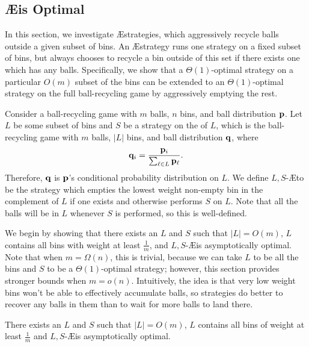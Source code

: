 \subsection{\AE is Optimal}\label{sec:br-randomballaggroempty}

In this section, we investigate \AE strategies, which aggressively recycle
balls outside a given subset of bins.  An \AE strategy runs one strategy on a
fixed subset of bins, but always chooses to recycle a bin outside of this set
if there exists one which has any balls.  Specifically, we show that a
$\Theta(1)$-optimal strategy on a particular $O(m)$ subset of the bins can be
extended to an $\Theta(1)$-optimal strategy on the full ball-recycling game by
aggressively emptying the
rest.

Consider a ball-recycling game with $m$ balls, $n$ bins, and ball distribution
$\mathbf{p}$. Let $L$ be some subset of bins and $S$ be a strategy on the  of $L$, which is the ball-recycling game with $m$ balls,
$|L|$ bins, and ball distribution $\mathbf{q}$, where 
\begin{equation*}
	\mathbf{q}_i = \frac{\mathbf{p}_i}{\sum_{\ell \in L} \mathbf{p}_\ell}.
\end{equation*}
Therefore, $\mathbf{q}$ is $\mathbf{p}$'s conditional probability distribution on $L$. We
define $L,S$-\AE to be the strategy which empties the lowest weight non-empty
bin in the complement of $L$ if one exists and otherwise performs $S$ on $L$.
Note that all the balls will be in $L$ whenever $S$ is performed, so this is
well-defined.

We begin by showing that there exists an $L$ and $S$ such that $|L|=O(m)$, $L$
contains all bins with weight at least $\frac{1}{m}$, and $L,S$-\AE is
asymptotically optimal. Note that when $m = \Omega(n)$, this is trivial,
because we can take $L$ to be all the bins and $S$ to be a $\Theta(1)$-optimal
strategy; however, this section provides stronger bounds when $m = o(n)$.
Intuitively, the idea is that very low weight bins won't be able to effectively
accumulate balls, so strategies do better to recover any balls in them than to
wait for more balls to land there.

\begin{lemma}\label{lem:aggroopt}
	There exists an $L$ and $S$ such that $|L|=O(m)$, $L$ contains all bins of
	weight at least $\frac{1}{m}$ and $L,S$-\AE is asymptotically optimal.
\end{lemma}

